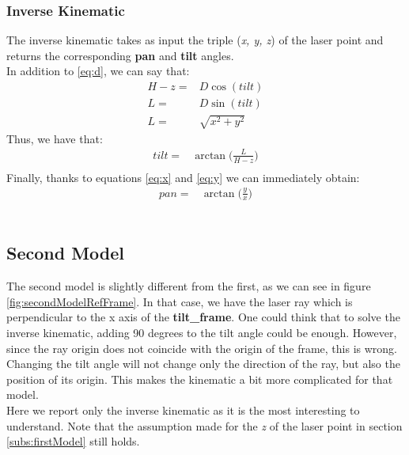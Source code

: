 \subsubsection{Inverse Kinematic}
The inverse kinematic takes as input the triple (\textit{x, y, z}) of the laser point and returns the corresponding \textbf{pan} and \textbf{tilt} angles.\\
In addition to \ref{eq:d}, we can say that:
\begin{align}
    H-z =& D\cos(tilt)\\
	L =& D\sin(tilt) \label{eq:dsin}\\
	L=& \sqrt{x^2+y^2}
\end{align}
Thus, we have that:
\begin{align}
    tilt =& \arctan\bigg(\frac{L}{H-z}\bigg) \label{eq:tiltik}\\
\end{align}
Finally, thanks to equations \ref{eq:x} and \ref{eq:y} we can immediately obtain:
\begin{align}
	pan=& \arctan\bigg(\frac{y}{x}\bigg)\label{eq:panik}
\end{align}
\\
\subsection{Second Model} \label{subs:secondModel}
The second model is slightly different from the first, as we can see in figure \ref{fig:secondModelRefFrame}. In that case, we have the laser ray which is perpendicular to the x axis of the \textbf{tilt\_frame}. One could think that to solve the inverse kinematic, adding 90 degrees to the tilt angle could be enough. However, since the ray origin does not coincide with the origin of the frame, this is wrong. Changing the tilt angle will not change only the direction of the ray, but also the position of its origin. This makes the kinematic a bit more complicated for that model.
\\
Here we report only the inverse kinematic as it is the most interesting to understand. Note that the assumption made for the \textit{z} of the laser point in section \ref{subs:firstModel} still holds.

